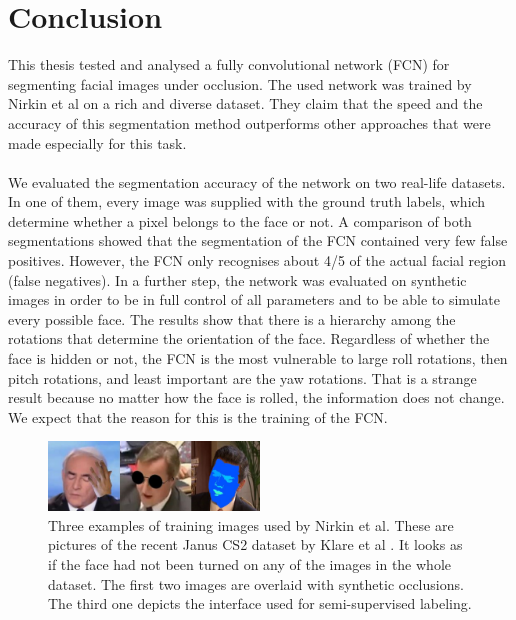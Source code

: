 \chapter{Conclusion}
This thesis tested and analysed a fully convolutional network (FCN) for segmenting facial images under occlusion. The used network was trained by Nirkin et al \cite{nirkin2018_faceswap} on a rich and diverse dataset. They claim that the speed and the accuracy of this segmentation method outperforms other approaches that were made especially for this task.\\
\\
We evaluated the segmentation accuracy of the network on two real-life datasets. In one of them, every image was supplied with the ground truth labels, which determine whether a pixel belongs to the face or not. A comparison of both segmentations showed that the segmentation of the FCN contained very few false positives. However, the FCN only recognises about 4/5 of the actual facial region (false negatives). In a further step, the network was evaluated on synthetic images in order to be
in full control of all parameters and to be able to simulate every possible face. The results show that there is a hierarchy among the rotations that determine the orientation of the face. Regardless of whether the face is hidden or not, the FCN is the most vulnerable to large roll rotations, then pitch rotations, and least important are the yaw rotations. That is a strange result because no matter how the face is rolled, the information does not change. We expect that the reason for this is the training of the FCN. 

\begin{figure}
	\centering
	\includegraphics[width=0.5\textwidth]{Figures/chap5/tran_frames.png}
	\caption{Three examples of training images used by Nirkin et al. These are pictures of the recent Janus CS2 dataset by Klare et al \cite{IARPAJanus}. It looks as if the face had not been turned on any of the images in the whole dataset. The first two images are overlaid with synthetic occlusions. The third one depicts the interface used for semi-supervised labeling.}
	\label{fig:chap5:train_images}
\end{figure}

